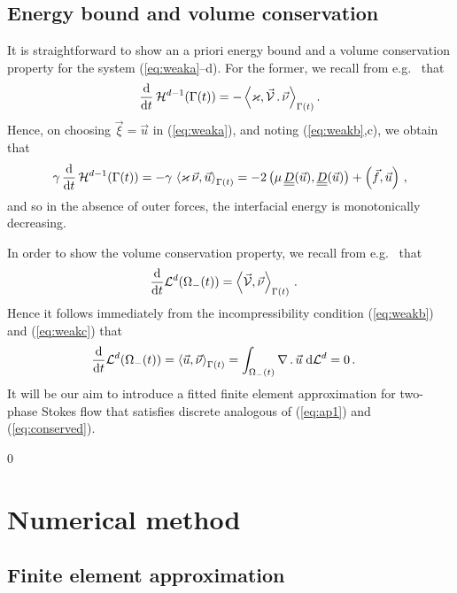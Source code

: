 \documentclass[a4paper,12pt,onecolumn]{article}
\newcommand{\vol}{\mathcal{L}^d}
\newcommand{\dL}[1]{\;{\rm d}{\cal L}^{#1}} %
\newcommand{\ddt}{\frac{\rm d}{{\rm d}t}}
\newcommand{\mat}[1]{\underline{\underline{#1}}\rule{0pt}{0pt}}
\begin{document}
\subsection{Energy bound and volume conservation}
It is straightforward to show an a priori energy bound and a volume
conservation property for the system (\ref{eq:weaka}--d). For the former, we
recall from e.g.\ \cite[Lemma~2.1]{DeckelnickDE05} that
\begin{equation}\label{eq:dtarea}
\ddt\,\mathcal{H}^{d-1}(\Gamma(t)) = -
\left\langle \varkappa, \vec{\mathcal{V}}\,.\,\vec\nu \right\rangle_{\Gamma(t)}. 
\end{equation}
Hence, on choosing $\vec\xi = \vec u$ in (\ref{eq:weaka}), and noting
(\ref{eq:weakb},c), we obtain that
\begin{align}
\gamma\, \ddt\,\mathcal{H}^{d-1}(\Gamma(t)) = -
\gamma\,\left\langle \varkappa\,\vec\nu, \vec u\right\rangle_{\Gamma(t)} 
=  - 2\left(\mu\,\mat D(\vec u), \mat D(\vec u)\right) +
\left(\vec f, \vec u\right) \,,
\label{eq:ap1}
\end{align}
and so in the absence of outer forces, the interfacial energy is monotonically
decreasing.

In order to show the volume conservation property, we recall from e.g.\
\cite[Lemma~2.1]{DeckelnickDE05} that
\begin{align}
\ddt \vol(\Omega_-(t)) & = \left\langle \vec{\mathcal{V}}, \vec\nu 
\right\rangle_{\Gamma(t)}\,.
\end{align}
Hence it follows immediately from the incompressibility condition
(\ref{eq:weakb}) and (\ref{eq:weakc}) that
\begin{align}
\ddt \vol(\Omega_-(t)) & = \left\langle \vec u , \vec\nu
\right\rangle_{\Gamma(t)}
 = \int_{\Omega_-(t)} \nabla\,.\,\vec u \dL{d} =0\,. \label{eq:conserved}
\end{align}
It will be our aim to introduce a fitted finite element approximation for 
two-phase Stokes flow that satisfies discrete analogous of 
(\ref{eq:ap1}) and (\ref{eq:conserved}).

\setcounter{equation} 0
\section{Numerical method} \label{sec:3}
\subsection{Finite element approximation}\label{sec:fem}
\end{document}
